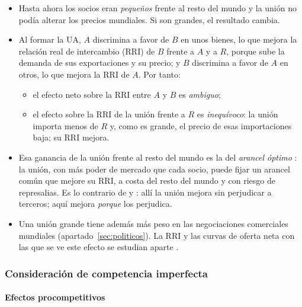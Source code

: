 \documentclass[11pt]{article}
\begin{document}
\begin{itemize}
\item Hasta ahora los socios eran \emph{pequeños} frente al resto del mundo y la unión no podía alterar los precios mundiales. Si son grandes, el resultado cambia\nocite{Mundell1964Tariff}.
\item Al formar la UA, $A$ discrimina a favor de $B$ en unos bienes, lo que mejora la relación real de intercambio (RRI) de $B$ frente a $A$ y a $R$, porque sube la demanda de sus exportaciones y su precio; y $B$ discrimina a favor de $A$ en otros, lo que mejora la RRI de $A$. Por tanto:
  \begin{itemize}
  \item el efecto neto sobre la RRI entre $A$ y $B$ es \emph{ambiguo};
  \item el efecto sobre la RRI de la unión frente a $R$ es \emph{inequívoco}: la unión importa menos de $R$ y, como es grande, el precio de esas importaciones baja; su RRI mejora.
  \end{itemize}
\item Esa ganancia de la unión frente al resto del mundo es la del \emph{arancel óptimo} : la unión, con más poder de mercado que cada socio, puede fijar un arancel común que mejore su RRI, a costa del resto del mundo y con riesgo de represalias. Es lo contrario de  y : allí la unión mejora sin perjudicar a terceros; aquí mejora \emph{porque} los perjudica.
\item Una unión grande tiene además más peso en las negociaciones comerciales mundiales (apartado~\ref{sec:politicos}). La RRI y las curvas de oferta neta con las que se ve este efecto se estudian aparte .
\end{itemize}

\subsubsection{Consideración de competencia imperfecta}\label{sec:competencia-imperfecta}

\paragraph{Efectos procompetitivos}
\end{document}
